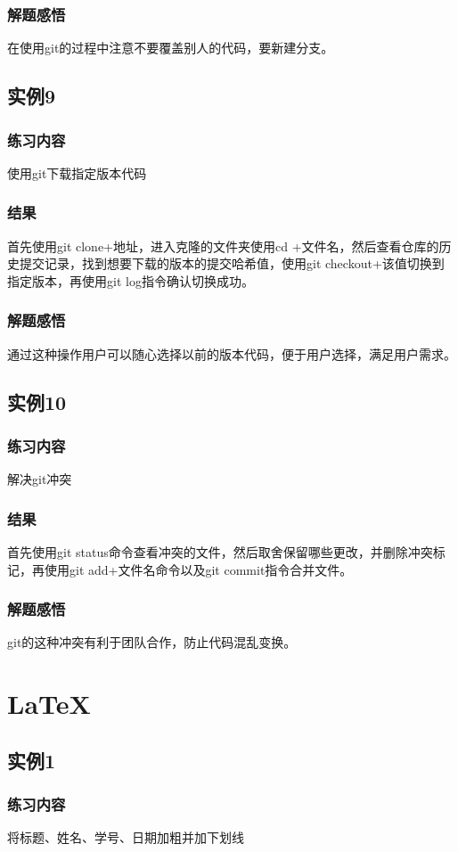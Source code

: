 \documentclass{ctexart}
\begin{document}
\subsubsection{解题感悟}
在使用git的过程中注意不要覆盖别人的代码，要新建分支。
\subsection{实例9}
\subsubsection{练习内容}
使用git下载指定版本代码
\subsubsection{结果}
首先使用git clone+地址，进入克隆的文件夹使用cd +文件名，然后查看仓库的历史提交记录，找到想要下载的版本的提交哈希值，使用git checkout+该值切换到指定版本，再使用git log指令确认切换成功。
\subsubsection{解题感悟}
通过这种操作用户可以随心选择以前的版本代码，便于用户选择，满足用户需求。
\subsection{实例10}
\subsubsection{练习内容}
解决git冲突
\subsubsection{结果}
首先使用git status命令查看冲突的文件，然后取舍保留哪些更改，并删除冲突标记，再使用git add+文件名命令以及git commit指令合并文件。
\subsubsection{解题感悟}
git的这种冲突有利于团队合作，防止代码混乱变换。
\section{LaTeX}
\subsection{实例1}
\subsubsection{练习内容}
将标题、姓名、学号、日期加粗并加下划线
\end{document}

